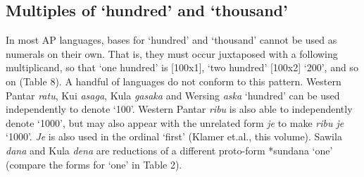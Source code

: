 {\subsection{Multiples of `hundred' and `thousand'}
In most AP languages, bases for `hundred' and `thousand' cannot be used as numerals on their own. That is, they must occur juxtaposed with a following multiplicand, so that `one hundred' is [100x1], `two hundred' [100x2] `200', and so on (Table 8). A handful of languages do not conform to this pattern. Western Pantar \textit{ratu}, Kui \textit{asaga}, Kula \textit{gasaka} and Wersing \textit{aska} `hundred' can be used independently to denote `100'. Western Pantar \textit{ribu} is also able to independently denote `1000', but may also appear with the unrelated form \textit{je} to make \textit{ribu je} `1000'. \textit{Je} is also used in the ordinal `first' (Klamer et.al., this volume). Sawila \textit{dana} and Kula \textit{dena} are reductions of a different proto-form *sundana `one' (compare the forms for `one' in Table 2).





\begin{sidewaystable}



\end{sidewaystable}}
